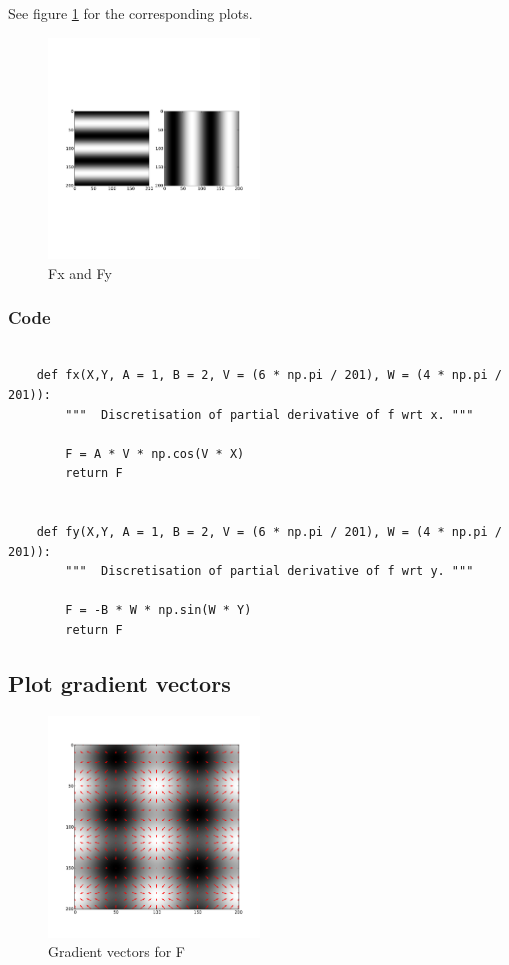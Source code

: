 \documentclass[abstract=true]{scrartcl}
\begin{document}
        See figure \ref{fx_fy} for the corresponding plots.

        \begin{figure}
          \centering
          \includegraphics[width=0.5\textwidth]{../images/0_fx_and_fy}
          \caption{Fx and Fy}
          \label{fx_fy}
        \end{figure}

        \subsubsection{Code}

        \begin{verbatim}

    def fx(X,Y, A = 1, B = 2, V = (6 * np.pi / 201), W = (4 * np.pi / 201)):
        """  Discretisation of partial derivative of f wrt x. """
        
        F = A * V * np.cos(V * X)
        return F


    def fy(X,Y, A = 1, B = 2, V = (6 * np.pi / 201), W = (4 * np.pi / 201)):
        """  Discretisation of partial derivative of f wrt y. """

        F = -B * W * np.sin(W * Y)
        return F

        \end{verbatim}

    \subsection{Plot gradient vectors}

        \begin{figure}
          \centering
          \includegraphics[width=0.5\textwidth]{../images/1_quiver}
          \caption{Gradient vectors for F}
        \end{figure}
\end{document}
